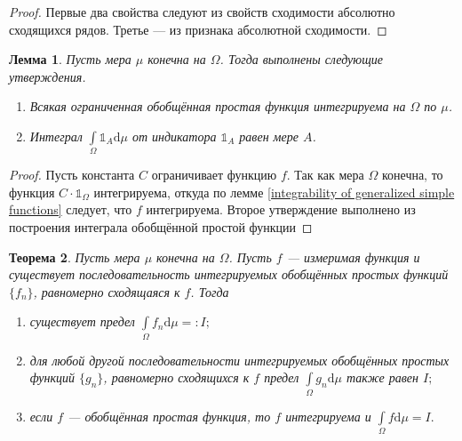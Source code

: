 \documentclass[12pt]{article}
\newtheorem{theorem}{Теорема}
\newtheorem{lemma}[theorem]{Лемма}
\numberwithin{theorem}{section}
\theoremstyle{definition}
\newcommand{\ind}{\mathds{1}}
\newcommand{\diff}{\mathrm{d}}
\begin{document}
	\begin{proof}
		Первые два свойства следуют из свойств сходимости абсолютно сходящихся рядов.
		Третье --- из признака абсолютной сходимости.
	\end{proof}
	
	\begin{lemma} \label{finite measure and generalized simple functions}
		Пусть мера $ \mu $ конечна на $ \Omega $. Тогда выполнены следующие утверждения.
		\begin{enumerate}
			\item Всякая ограниченная обобщённая простая функция интегрируема на $ \Omega $ по $ \mu $.
			\item Интеграл $ \int\limits_{\Omega} \ind_{A}\diff\mu $ от индикатора $ \ind_{A} $ равен мере $ A $.
		\end{enumerate}
	\end{lemma}
	
	\begin{proof}
		Пусть константа $ C $ ограничивает функцию $ f $. Так как мера $ \Omega $ конечна, 
		то функция $ C\cdot \ind_{\Omega} $ интегрируема, откуда по лемме \ref{integrability of generalized simple functions} следует, что $ f $ интегрируема.
		Второе утверждение выполнено из построения интеграла обобщённой простой функции
	\end{proof}
	
	\begin{theorem} \label{integrability}
		Пусть мера $ \mu $ конечна на $ \Omega $.
		Пусть $ f $ --- измеримая функция и существует последовательность интегрируемых обобщённых простых функций $ \{f_n\} $,
		равномерно сходящаяся к $ f $. Тогда
		\begin{enumerate}
			\item существует предел $ \int\limits_{\Omega} f_n \diff\mu =: I; $
			\item для любой другой последовательности интегрируемых обобщённых простых функций $ \{g_n\} $,
			равномерно сходящихся к $ f $ предел $ \int\limits_{\Omega} g_n \diff\mu $ также равен $ I; $
			\item если $ f $ --- обобщённая простая функция, то $ f $ интегрируема и $ \int\limits_{\Omega} f\diff\mu = I. $
		\end{enumerate}
	\end{theorem}
	
\end{document}
